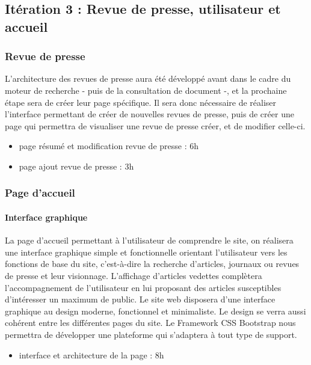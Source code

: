 \subsection{Itération 3 : Revue de presse, utilisateur et accueil}
\label{subsec:revue_util_accueil}
	\subsubsection{Revue de presse}
	\label{subsubsec:revue}

		L'architecture des revues de presse aura été développé avant dans le cadre du moteur de recherche - puis de la consultation de document -, et la prochaine étape sera de créer leur page spécifique. Il sera donc nécessaire de réaliser l'interface permettant de créer de nouvelles revues de presse, puis de créer une page qui permettra de visualiser une revue de presse créer, et de modifier celle-ci.

		\begin{itemize}
			\item page résumé et modification revue de presse : 6h
			\item page ajout revue de presse : 3h
		\end{itemize}

	\subsubsection{Page d'accueil}
	\label{subsubsec:accueil}
		\paragraph{Interface graphique}
			
			La page d'accueil permettant à l'utilisateur de comprendre le site, on réalisera une interface graphique simple et fonctionnelle orientant l'utilisateur vers les fonctions de base du site, c'est-à-dire la recherche d'articles, journaux ou revues de presse et leur visionnage. L'affichage d'articles vedettes complètera l'accompagnement de l'utilisateur en lui proposant des articles susceptibles d'intéresser un maximum de public.
			Le site web disposera d'une interface graphique au design moderne, fonctionnel et minimaliste. Le design se verra aussi cohérent entre les différentes pages du site. Le Framework CSS Bootstrap nous permettra de développer une plateforme qui s'adaptera à tout type de support.

			\begin{itemize}
				\item interface et architecture de la page : 8h
			\end{itemize}

